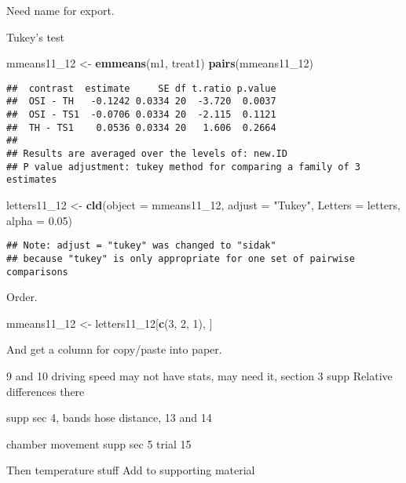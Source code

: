 \documentclass[
]{article}
\newenvironment{Shaded}{\begin{snugshade}}{\end{snugshade}}
\newcommand{\AttributeTok}[1]{\textcolor[rgb]{0.13,0.29,0.53}{#1}}
\newcommand{\DecValTok}[1]{\textcolor[rgb]{0.00,0.00,0.81}{#1}}
\newcommand{\FloatTok}[1]{\textcolor[rgb]{0.00,0.00,0.81}{#1}}
\newcommand{\FunctionTok}[1]{\textcolor[rgb]{0.13,0.29,0.53}{\textbf{#1}}}
\newcommand{\NormalTok}[1]{#1}
\newcommand{\OtherTok}[1]{\textcolor[rgb]{0.56,0.35,0.01}{#1}}
\newcommand{\SpecialCharTok}[1]{\textcolor[rgb]{0.81,0.36,0.00}{\textbf{#1}}}
\newcommand{\StringTok}[1]{\textcolor[rgb]{0.31,0.60,0.02}{#1}}
\begin{document}
Need name for export.

Tukey's test

\begin{Shaded}
\begin{Highlighting}[]
\NormalTok{mmeans11\_12 }\OtherTok{\textless{}{-}} \FunctionTok{emmeans}\NormalTok{(m1, }\StringTok{\textquotesingle{}treat1\textquotesingle{}}\NormalTok{)}
\FunctionTok{pairs}\NormalTok{(mmeans11\_12)}
\end{Highlighting}
\end{Shaded}

\begin{verbatim}
##  contrast  estimate     SE df t.ratio p.value
##  OSI - TH   -0.1242 0.0334 20  -3.720  0.0037
##  OSI - TS1  -0.0706 0.0334 20  -2.115  0.1121
##  TH - TS1    0.0536 0.0334 20   1.606  0.2664
## 
## Results are averaged over the levels of: new.ID 
## P value adjustment: tukey method for comparing a family of 3 estimates
\end{verbatim}

\begin{Shaded}
\begin{Highlighting}[]
\NormalTok{letters11\_12 }\OtherTok{\textless{}{-}} \FunctionTok{cld}\NormalTok{(}\AttributeTok{object =}\NormalTok{ mmeans11\_12,}
                  \AttributeTok{adjust =} \StringTok{"Tukey"}\NormalTok{,}
                  \AttributeTok{Letters =}\NormalTok{ letters,}
                  \AttributeTok{alpha =} \FloatTok{0.05}\NormalTok{)}
\end{Highlighting}
\end{Shaded}

\begin{verbatim}
## Note: adjust = "tukey" was changed to "sidak"
## because "tukey" is only appropriate for one set of pairwise comparisons
\end{verbatim}

Order.

\begin{Shaded}
\begin{Highlighting}[]
\NormalTok{mmeans11\_12 }\OtherTok{\textless{}{-}}\NormalTok{ letters11\_12[}\FunctionTok{c}\NormalTok{(}\DecValTok{3}\NormalTok{, }\DecValTok{2}\NormalTok{, }\DecValTok{1}\NormalTok{), ]}
\end{Highlighting}
\end{Shaded}

And get a column for copy/paste into paper.

\begin{Shaded}
\end{Shaded}

9 and 10 driving speed may not have stats, may need it, section 3 supp
Relative differences there

supp sec 4, bands hose distance, 13 and 14

chamber movement supp sec 5 trial 15

Then temperature stuff Add to supporting material
\end{document}
